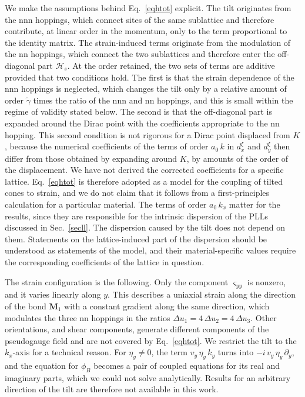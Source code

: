 \documentclass[aps,prb, onecolumn, nofootinbib, citeautoscript,10pt]{revtex4-2}
\newcommand{\bs}[1]{\boldsymbol{#1}}
\begin{document}
\label{secvalid}
We make the assumptions behind Eq.~\eqref{eqhtot} explicit. The tilt originates from the nnn hoppings, which connect sites of the same sublattice and therefore contribute, at linear order in the momentum, only to the term proportional to the identity matrix. The strain-induced terms originate from the modulation of the nn hoppings, which connect the two sublattices and therefore enter the off-diagonal part $\mathcal H_s$. At the order retained, the two sets of terms are additive provided that two conditions hold. The first is that the strain dependence of the nnn hoppings is neglected, which changes the tilt only by a relative amount of order $\tilde\gamma$ times the ratio of the nnn and nn hoppings, and this is small within the regime of validity stated below. The second is that the off-diagonal part is expanded around the Dirac point with the coefficients appropriate to the nn hopping. This second condition is not rigorous for a Dirac point displaced from $K$, because the numerical coefficients of the terms of order $a_0\,k$ in $d^\xi_x$ and $d^\xi_y$ then differ from those obtained by expanding around $K$, by amounts of the order of the displacement. We have not derived the corrected coefficients for a specific lattice. Eq.~\eqref{eqhtot} is therefore adopted as a model for the coupling of tilted cones to strain, and we do not claim that it follows from a first-principles calculation for a particular material. The terms of order $a_0\,k_x$ matter for the results, since they are responsible for the intrinsic dispersion of the PLLs discussed in Sec.~\ref{secll}. The dispersion caused by the tilt does not depend on them. Statements on the lattice-induced part of the dispersion should be understood as statements of the model, and their material-specific values require the corresponding coefficients of the lattice in question.

The strain configuration is the following. Only the component $\varsigma_{yy}$ is nonzero, and it varies linearly along $y$. This describes a uniaxial strain along the direction of the bond $\bs M_1$ with a constant gradient along the same direction, which modulates the three nn hoppings in the ratios $\Delta u_1=4\,\Delta u_2=4\,\Delta u_3$. Other orientations, and shear components, generate different components of the pseudogauge field and are not covered by Eq.~\eqref{eqhtot}. We restrict the tilt to the $k_x$-axis for a technical reason. For $\eta_y\neq0$, the term $v_y\,\eta_y\,k_y$ turns into $-i\,v_y\,\eta_y\,\partial_y$, and the equation for $\phi_B$ becomes a pair of coupled equations for its real and imaginary parts, which we could not solve analytically. Results for an arbitrary direction of the tilt are therefore not available in this work.
\end{document}
